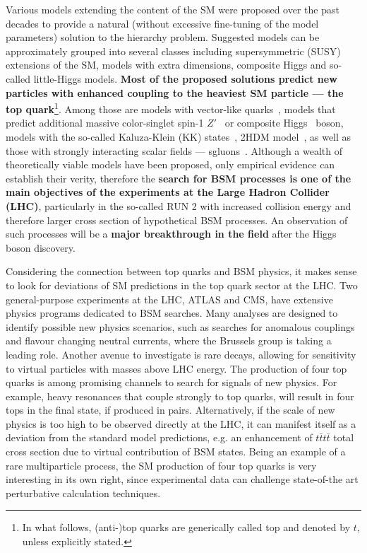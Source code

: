 \textcolor{\mycolor}{
Various models extending the content of the SM were proposed over the past decades to provide a natural (without excessive fine-tuning of the model parameters) solution to the hierarchy problem. Suggested models can be approximately grouped into several classes including supersymmetric (SUSY) extensions of the SM, models with extra dimensions, composite Higgs and so-called little-Higgs models. \textbf{Most of the proposed solutions predict new particles with enhanced coupling to the heaviest SM particle --- the top quark}\footnote{In what follows, (anti-)top quarks are generically called top and denoted by $t$, unless explicitly stated.}. Among those are models with vector-like quarks~\cite{Aguilar-Saavedra:2013qpa}, models that predict additional massive color-singlet spin-1 $Z'$~\cite{Langacker:2008yv} or composite Higgs~\cite{Agashe:2004rs} boson, models with the so-called Kaluza-Klein (KK) states~\cite{Agashe:2006hk,Davoudiasl:1999jd}, 2HDM model~\cite{Dicus:1994bm,Craig:2015jba,Craig:2016ygr}, as well as those with strongly interacting scalar fields --- sgluons~\cite{Plehn:2008ae,GoncalvesNetto:2012nt}. Although a wealth of theoretically viable models have been proposed, only empirical evidence can establish their verity, therefore the \textbf{search for BSM processes is one of the main objectives of the experiments at the Large Hadron Collider (LHC)}, particularly in the so-called RUN 2 with increased collision energy and therefore larger cross section of hypothetical BSM processes. An observation of such processes will be a \textbf{major breakthrough in the field} after the Higgs boson discovery.}

\textcolor{\mycolor}{
Considering the connection between top quarks and BSM physics, it makes sense to look for deviations of SM predictions in the top quark sector at the LHC. Two general-purpose experiments at the LHC, ATLAS and CMS, have extensive physics programs dedicated to BSM searches. Many analyses are designed to identify possible new physics scenarios, such as searches for anomalous couplings and flavour changing neutral currents, where the Brussels group is taking a leading role. Another avenue to investigate is rare decays, allowing for sensitivity to virtual particles with masses above LHC energy. The production of four top quarks is among promising channels to search for signals of new physics. For example, heavy resonances that couple strongly to top quarks, will result in four tops in the final state, if produced in pairs. Alternatively, if the scale of new physics is too high to be observed directly at the LHC, it can manifest itself as a deviation from the standard model predictions, e.g. an enhancement of $t\bar{t}t\bar{t}$ total cross section due to virtual contribution of BSM states. Being an example of a rare multiparticle process, the SM production of four top quarks is very interesting in its own right, since experimental data can challenge state-of-the art perturbative calculation techniques.
}

